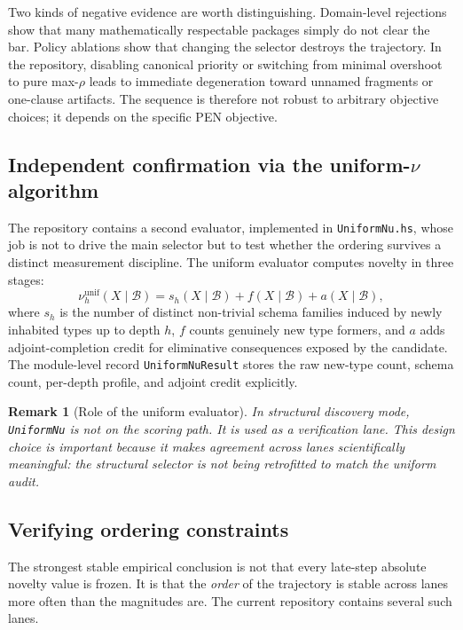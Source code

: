 \documentclass[pdflatex,sn-mathphys,Numbered]{sn-jnl}
\theoremstyle{thmstyleone}
\theoremstyle{thmstylethree}
\theoremstyle{thmstyletwo}
\newtheorem{remark}[theorem]{Remark}
\newcommand{\Bcal}{\mathcal{B}}
\begin{document}
Two kinds of negative evidence are worth distinguishing. Domain-level rejections show that many mathematically respectable packages simply do not clear the bar. Policy ablations show that changing the selector destroys the trajectory. In the repository, disabling canonical priority or switching from minimal overshoot to pure max-$\rho$ leads to immediate degeneration toward unnamed fragments or one-clause artifacts. The sequence is therefore not robust to arbitrary objective choices; it depends on the specific PEN objective.

\subsection{Independent confirmation via the uniform-\texorpdfstring{$\nu$}{nu} algorithm}

The repository contains a second evaluator, implemented in \texttt{UniformNu.hs}, whose job is not to drive the main selector but to test whether the ordering survives a distinct measurement discipline. The uniform evaluator computes novelty in three stages:
\begin{equation}
\label{eq:uniformnu}
  \nu^{\mathrm{unif}}_h(X\mid\Bcal)
  = s_h(X\mid\Bcal) + f(X\mid\Bcal) + a(X\mid\Bcal),
\end{equation}
where $s_h$ is the number of distinct non-trivial schema families induced by newly inhabited types up to depth $h$, $f$ counts genuinely new type formers, and $a$ adds adjoint-completion credit for eliminative consequences exposed by the candidate. The module-level record \texttt{UniformNuResult} stores the raw new-type count, schema count, per-depth profile, and adjoint credit explicitly.

\begin{remark}[Role of the uniform evaluator]
In structural discovery mode, \texttt{UniformNu} is not on the scoring path. It is used as a verification lane. This design choice is important because it makes agreement across lanes scientifically meaningful: the structural selector is not being retrofitted to match the uniform audit.
\end{remark}

\subsection{Verifying ordering constraints}

The strongest stable empirical conclusion is not that every late-step absolute novelty value is frozen. It is that the \emph{order} of the trajectory is stable across lanes more often than the magnitudes are. The current repository contains several such lanes.
\end{document}
